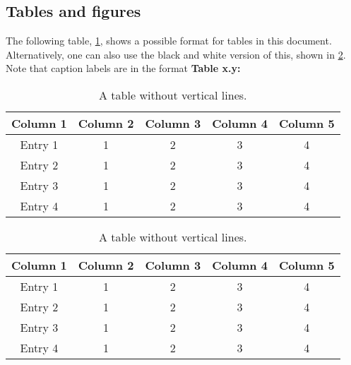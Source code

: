 \newpage

\subsection{Tables and figures}
The following table, \cref{table: style 1}, shows a possible format for tables in this document. Alternatively, one can also use the black and white version of this, shown in \cref{table: style 2}. Note that caption labels are in the format \textbf{\textcolor{color_scheme}{Table x.y:} }
\begin{table}[ht]
\centering
\caption{A table without vertical lines.}
\begin{tabular}[t]{ccccc}
\toprule
\color{color_scheme}\textbf{Column 1}&\color{color_scheme}\textbf{Column 2}&\color{color_scheme}\textbf{Column 3}&\color{color_scheme}\textbf{Column 4}&\color{color_scheme}\textbf{Column 5}\\
\midrule
Entry 1&1&2&3&4\\
Entry 2&1&2&3&4\\
Entry 3&1&2&3&4\\
Entry 4&1&2&3&4\\
\bottomrule
\end{tabular}
\label{table: style 1}
\end{table}

\begin{table}[ht]
\centering
\caption{A table without vertical lines.}
\begin{tabular}[t]{ccccc}
\toprule
\color{color_scheme}\textbf{Column 1}&\textbf{Column 2}&\textbf{Column 3}&\textbf{Column 4}&\textbf{Column 5}\\
\midrule
Entry 1&1&2&3&4\\
Entry 2&1&2&3&4\\
Entry 3&1&2&3&4\\
Entry 4&1&2&3&4\\
\bottomrule
\end{tabular}
\label{table: style 2}
\end{table}


